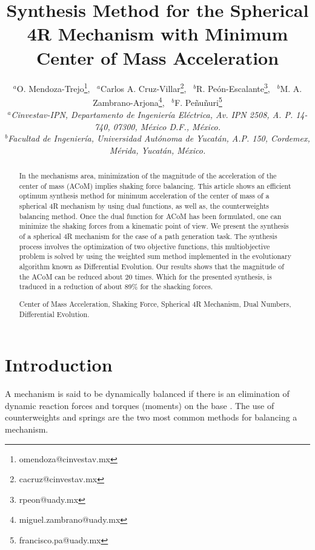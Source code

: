 \documentclass[11pt]{article}
\providecommand{\keywords}[1]{\noindent{\textbf{\textit{Keywords---}}} #1}
\begin{document}
\title{Synthesis Method for the Spherical 4R Mechanism with Minimum 
Center of Mass Acceleration}

\author{{\small
$^a$O. Mendoza-Trejo\footnote{omendoza@cinvestav.mx},~
$^a$Carlos A. Cruz-Villar\footnote{cacruz@cinvestav.mx},~ 
$^b$R. Pe\'on-Escalante\footnote{rpeon@uady.mx},~
$^b$M. A. Zambrano-Arjona\footnote{miguel.zambrano@uady.mx},~
$^b$F. Pe\~nu\~nuri\footnote{francisco.pa@uady.mx}}\\
{\footnotesize \textit{$^a$Cinvestav-IPN, Departamento de Ingenier\'ia 
El\'ectrica, Av. IPN 2508, A. P. 14-740, 07300, M\'e\-xi\-co D.F., 
M\'exico.}}\\
{\footnotesize \textit{$^b$Facultad de Ingenier\'ia, Universidad 
Aut\'onoma de Yucat\'an, A.P. 150, Cordemex, M\'erida, Yucat\'an, 
M\'exico.}}
}
\date{}
\maketitle
\begin{abstract}
In the mechanisms area, minimization of the magnitude of the 
acceleration of the center of mass (ACoM) implies shaking force 
balancing.  This article shows an efficient optimum 
synthesis method for minimum acceleration of the center of mass of a 
spherical 4R mechanism by using dual functions, as well as, the 
counterweights balancing method. Once the dual function for ACoM has 
been formulated, one can minimize the shaking forces from a kinematic 
point of view. We present the synthesis of a spherical 4R mechanism for 
the case of a path generation task. The synthesis process involves the 
optimization of two objective functions, this multiobjective problem is 
solved by using the weighted sum method implemented in the evolutionary 
algorithm known as Differential Evolution. Our results shows that the
magnitude of the ACoM can be reduced about 20 times. Which for the 
presented synthesis, is traduced in a reduction of about 89\% for the 
shacking forces.

\vspace*{0.25cm}
\keywords{Center of Mass Acceleration, Shaking Force, Spherical 4R 
Mechanism, Dual Numbers, Differential Evolution.}
\end{abstract}

\section{Introduction}
A mechanism is said to be dynamically balanced if there is 
an elimination of dynamic reaction forces  and torques (moments) on the 
base \cite{Gosselin2004,Qimi2010,Wijk2009,Wijk2013}.
The use of counterweights \cite{Bagci1982,Feng1990,Smith1999,
Schutter2006} and springs \cite{Gosselin1999, Agrawal2005, Deepak2012} 
are the two most common methods for balancing a mechanism.
\end{document}
